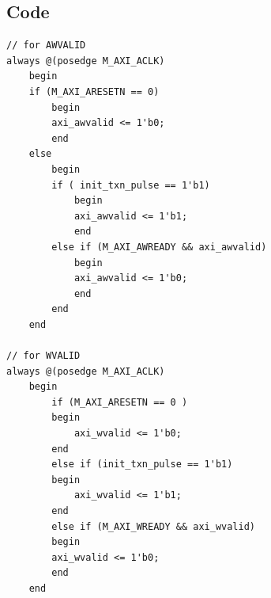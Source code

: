 \documentclass{article}
\begin{document}
\subsection{Code}
\begin{verbatim}
// for AWVALID
always @(posedge M_AXI_ACLK)										      
    begin                                                              
    if (M_AXI_ARESETN == 0)                                                   
        begin                                                                    
        axi_awvalid <= 1'b0;                                                   
        end                                                                      
    else                                                                       
        begin                                                                    
        if ( init_txn_pulse == 1'b1)                                                
            begin                                                                
            axi_awvalid <= 1'b1;                                               
            end                                                                  
        else if (M_AXI_AWREADY && axi_awvalid)                                 
            begin                                                                
            axi_awvalid <= 1'b0;                                               
            end                                                                  
        end                                                                      
    end                                                                          

// for WVALID
always @(posedge M_AXI_ACLK)                                        
    begin                                                                         
        if (M_AXI_ARESETN == 0 )                                                    
        begin                                                                     
            axi_wvalid <= 1'b0;                                                     
        end                                                                       
        else if (init_txn_pulse == 1'b1)                                                
        begin                                                                     
            axi_wvalid <= 1'b1;                                                     
        end                                                                        
        else if (M_AXI_WREADY && axi_wvalid)                                        
        begin                                                                     
        axi_wvalid <= 1'b0;                                                      
        end                                                                       
    end  
    

\end{verbatim}
\end{document}
